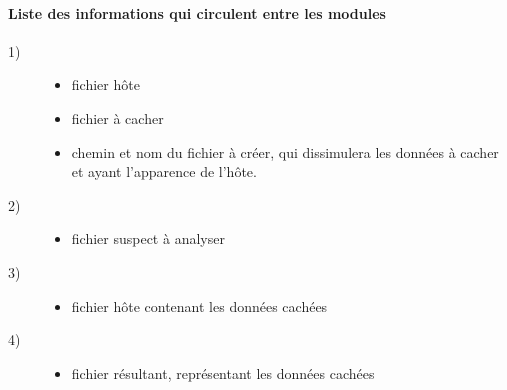 \documentclass[11pt]{article}
\begin{document}
\paragraph{Liste des informations qui circulent entre les modules}
\begin{description}
\item[1)] 
\begin{itemize}
\item fichier hôte 
\item fichier à cacher 
\item chemin et nom du fichier à créer, qui dissimulera les données à cacher et ayant l'apparence de l'hôte. 
\end{itemize}
\item[2)] 
\begin{itemize}
\item fichier suspect à analyser
\end{itemize}
\item[3)] 
\begin{itemize}
\item fichier hôte contenant les données cachées 
\end{itemize}
\item[4)]
\begin{itemize}
\item fichier résultant, représentant les données cachées 
\end{itemize}
\end{description}
\end{document}
